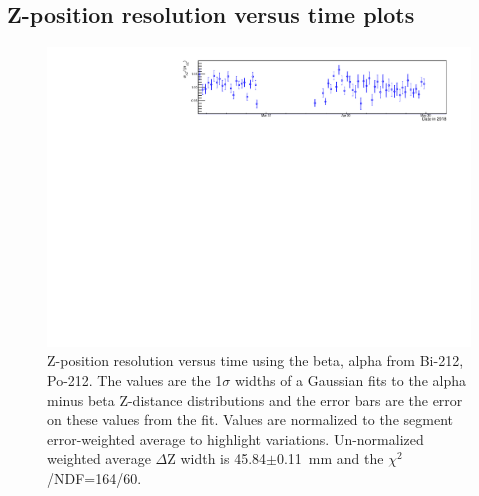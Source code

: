 \subsection{Z-position resolution versus time plots}
\begin{figure}[!h]
\centering
\includegraphics[width=1.05\textwidth]{figures/PubBiPo212ZresvsT.pdf}
\caption{\label{fig:ZresvsT212}Z-position resolution versus time using the beta, alpha from Bi-212, Po-212. The values are the 1$\sigma$ widths of a Gaussian fits to the alpha minus beta Z-distance distributions and the error bars are the error on these values from the fit. Values are normalized to the segment error-weighted average to highlight variations. Un-normalized weighted average $\Delta$Z width is 45.84$\pm$0.11~mm and the $\chi^2$/NDF=164/60.}
\end{figure}
